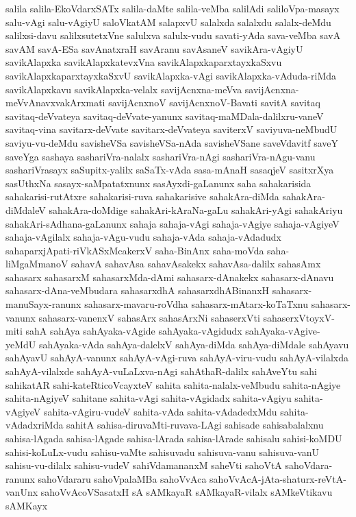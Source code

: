 {salila
salila-EkoVdarxSATx
salila-daMte
salila-veMba
salilAdi
saliloVpa-masayx
salu-vAgi
salu-vAgiyU
saloVkatAM
salapxvU
salalxda
salalxdu
salalx-deMdu
salilxsi-davu
salilxsutetxVne
salulxva
salulx-vudu
savati-yAda
sava-veMba
savA
savAM
savA-ESa
savAnatxraH
savAranu
savAsaneV
savikAra-vAgiyU
savikAlapxka
savikAlapxkatevxVna
savikAlapxkaparxtayxkaSxvu
savikAlapxkaparxtayxkaSxvU
savikAlapxka-vAgi
savikAlapxka-vAduda-riMda
savikAlapxkavu
savikAlapxka-velalx
savijAcnxna-meVva
savijAcnxna-meVvAnavxvakArxmati
savijAcnxnoV
savijAcnxnoV-Bavati
savitA
savitaq
savitaq-deVvateya
savitaq-deVvate-yanunx
savitaq-maMDala-dalilxru-vaneV
savitaq-vina
savitarx-deVvate
savitarx-deVvateya
saviterxV
saviyuva-neMbudU
saviyu-vu-deMdu
savisheVSa
savisheVSa-nAda
savisheVSane
saveVdavitf
saveY
saveYga
sashaya
sashariVra-nalalx
sashariVra-nAgi
sashariVra-nAgu-vanu
sashariVrasayx
saSupitx-yalilx
saSaTx-vAda
sasa-mAnaH
sasaqjeV
sasitxrXya
sasUthxNa
sasayx-saMpatatxnunx
sasAyxdi-gaLanunx
saha
sahakarisida
sahakarisi-rutAtxre
sahakarisi-ruva
sahakarisive
sahakAra-diMda
sahakAra-diMdaleV
sahakAra-doMdige
sahakAri-kAraNa-gaLu
sahakAri-yAgi
sahakAriyu
sahakAri-sAdhana-gaLanunx
sahaja
sahaja-vAgi
sahaja-vAgiye
sahaja-vAgiyeV
sahaja-vAgilalx
sahaja-vAgu-vudu
sahaja-vAda
sahaja-vAdadudx
sahaparxjApati-riVkASxMcakerxV
saha-BinAnx
saha-moVda
saha-liMgaMmanoV
sahavA
sahavAsa
sahavAsakekx
sahavAsa-dalilx
sahasAmx
sahasarx
sahasarxM
sahasarxMda-dAmi
sahasarx-dAnakekx
sahasarx-dAnavu
sahasarx-dAna-veMbudara
sahasarxdhA
sahasarxdhABinanxH
sahasarx-manuSayx-ranunx
sahasarx-mavaru-roVdha
sahasarx-mAtarx-koTaTxnu
sahasarx-vanunx
sahasarx-vanenxV
sahasArx
sahasArxNi
sahaserxVti
sahaserxVtoyxV-miti
sahA
sahAya
sahAyaka-vAgide
sahAyaka-vAgidudx
sahAyaka-vAgive-yeMdU
sahAyaka-vAda
sahAya-dalelxV
sahAya-diMda
sahAya-diMdale
sahAyavu
sahAyavU
sahAyA-vanunx
sahAyA-vAgi-ruva
sahAyA-viru-vudu
sahAyA-vilalxda
sahAyA-vilalxde
sahAyA-vuLaLxva-nAgi
sahAthaR-dalilx
sahAveYtu
sahi
sahikatAR
sahi-kateRticoVcayxteV
sahita
sahita-nalalx-veMbudu
sahita-nAgiye
sahita-nAgiyeV
sahitane
sahita-vAgi
sahita-vAgidadx
sahita-vAgiyu
sahita-vAgiyeV
sahita-vAgiru-vudeV
sahita-vAda
sahita-vAdadedxMdu
sahita-vAdadxriMda
sahitA
sahisa-diruvaMti-ruvava-LAgi
sahisade
sahisabalalxnu
sahisa-lAgada
sahisa-lAgade
sahisa-lArada
sahisa-lArade
sahisalu
sahisi-koMDU
sahisi-koLuLx-vudu
sahisu-vaMte
sahisuvadu
sahisuva-vanu
sahisuva-vanU
sahisu-vu-dilalx
sahisu-vudeV
sahiVdamananxM
saheVti
sahoVtA
sahoVdara-ranunx
sahoVdararu
sahoVpalaMBa
sahoVvAca
sahoVvAcA-jAta-shaturx-reVtA-vanUnx
sahoVvAcoVSasatxH
sA
sAMkayaR
sAMkayaR-vilalx
sAMkeVtikavu
sAMKayx
}
